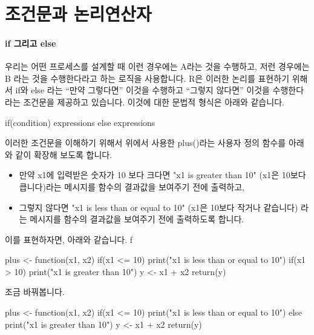 \section{조건문과 논리연산자}

\paragraph{if 그리고 else} 
우리는 어떤 프로세스를 설계할 때 이런 경우에는 A라는 것을 수행하고, 저런 경우에는 B 라는 것을 수행한다라고 하는 로직을 사용합니다. 
R은 이러한 논리를 표현하기 위해서 if와 else 라는 ``만약 그렇다면'' 이것을 수행하고 ``그렇지 않다면'' 이것을 수행한다라는 조건문을 제공하고 있습니다.  
이것에 대한 문법적 형식은 아래와 같습니다. 

\begin{Schunk}
\begin{Soutput}
if(condition){
	expressions
}
else {
	expressions
}
\end{Soutput}
\end{Schunk}

이러한 조건문을 이해하기 위해서 위에서 사용한 plus()라는 사용자 정의 함수를 아래와 같이 확장해 보도록 합니다. 

\begin{itemize}
	\item 만약 x1에 입력받은 숫자가 10 보다 크다면 "x1 is greater than 10" (x1은 10보다 큽니다)라는 메시지를 함수의 결과값을 보여주기 전에 출력하고, 
	\item 그렇지 않다면 "x1 is less than or equal to 10" (x1은 10보다 작거나 같습니다) 라는 메시지를 함수의 결과값을 보여주기 전에 출력하도록 합니다.
\end{itemize}

이를 표현하자면, 아래와 같습니다. 
f
\begin{Schunk}
\begin{Soutput}
plus <- function(x1, x2){
	if(x1 <= 10) print("x1 is less than or equal to 10")
	if(x1 > 10) print("x1 is greater than 10")
	y <- x1 + x2
	return(y)
}
\end{Soutput}
\end{Schunk}

조금 바꿔봅니다. 

\begin{Schunk}
\begin{Soutput}
plus <- function(x1, x2){
	if(x1 <= 10) print("x1 is less than or equal to 10")
	else print("x1 is greater than 10")
	y <- x1 + x2
	return(y)
}
\end{Soutput}
\end{Schunk}

